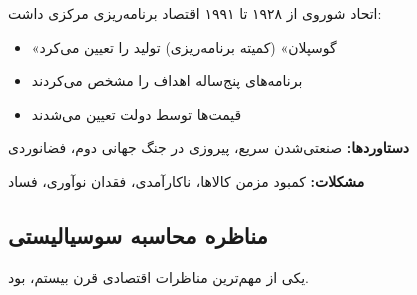 \begin{historybox}
اتحاد شوروی از ۱۹۲۸ تا ۱۹۹۱ اقتصاد برنامه‌ریزی مرکزی داشت:
\begin{itemize}[nosep]
    \item «گوسپلان» (کمیته برنامه‌ریزی) تولید را تعیین می‌کرد
    \item برنامه‌های پنج‌ساله اهداف را مشخص می‌کردند
    \item قیمت‌ها توسط دولت تعیین می‌شدند
\end{itemize}
\textbf{دستاوردها:} صنعتی‌شدن سریع، پیروزی در جنگ جهانی دوم، فضانوردی

\textbf{مشکلات:} کمبود مزمن کالاها، ناکارآمدی، فقدان نوآوری، فساد
\end{historybox}

\subsection{مناظره محاسبه سوسیالیستی}

یکی از مهم‌ترین مناظرات اقتصادی قرن بیستم،  بود.

